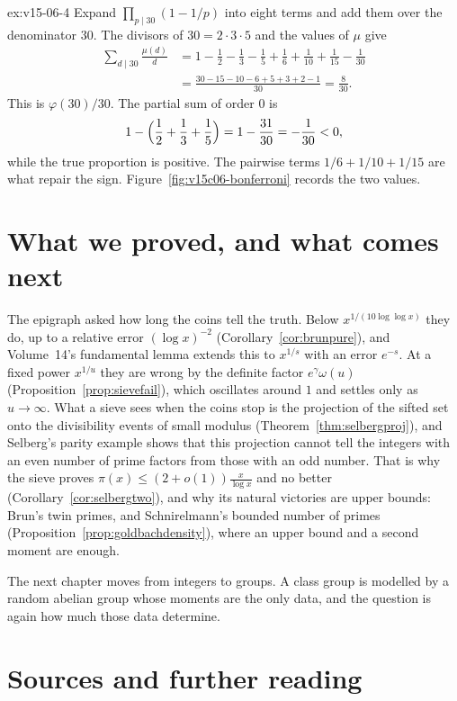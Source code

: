 \begin{solution}{ex:v15-06-4}
\idea Expand \(\prod_{p\mid30}(1-1/p)\) into eight terms and add them over the denominator \(30\).
\writeup The divisors of \(30=2\cdot3\cdot5\) and the values of \(\mu\) give
\begin{align*}
\sum_{d\mid30}\frac{\mu(d)}d
&=1-\frac12-\frac13-\frac15+\frac16+\frac1{10}+\frac1{15}-\frac1{30}\\
&=\frac{30-15-10-6+5+3+2-1}{30}=\frac8{30}.
\end{align*}
This is \(\varphi(30)/30\). The partial sum of order \(0\) is
\[
1-\Bigl(\frac12+\frac13+\frac15\Bigr)=1-\frac{31}{30}=-\frac1{30}<0,
\]
while the true proportion is positive. The pairwise terms \(1/6+1/10+1/15\) are what repair the sign. Figure~\ref{fig:v15c06-bonferroni} records the two values.
\end{solution}

\section{What we proved, and what comes next}

The epigraph asked how long the coins tell the truth. Below $x^{1/(10\log\log x)}$ they do, up to a relative error $(\log x)^{-2}$ (Corollary~\ref{cor:brunpure}), and Volume~14's fundamental lemma extends this to $x^{1/s}$ with an error $e^{-s}$. At a fixed power $x^{1/u}$ they are wrong by the definite factor $e^\gamma\omega(u)$ (Proposition~\ref{prop:sievefail}), which oscillates around $1$ and settles only as $u\to\infty$. What a sieve sees when the coins stop is the projection of the sifted set onto the divisibility events of small modulus (Theorem~\ref{thm:selbergproj}), and Selberg's parity example shows that this projection cannot tell the integers with an even number of prime factors from those with an odd number. That is why the sieve proves $\pi(x)\le(2+o(1))\frac x{\log x}$ and no better (Corollary~\ref{cor:selbergtwo}), and why its natural victories are upper bounds: Brun's twin primes, and Schnirelmann's bounded number of primes (Proposition~\ref{prop:goldbachdensity}), where an upper bound and a second moment are enough.

The next chapter moves from integers to groups. A class group is modelled by a random abelian group whose moments are the only data, and the question is again how much those data determine.

\section*{Sources and further reading}

